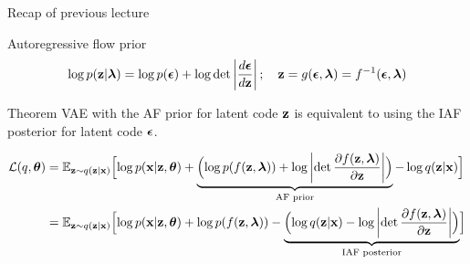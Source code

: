 

\begin{frame}
\titlepage
\end{frame}
\begin{frame}{Recap of previous lecture}
	\begin{block}{Autoregressive flow prior}
		\vspace{-0.5cm}
		\[
			\log p(\mathbf{z} | \boldsymbol{\lambda}) = \log p(\boldsymbol{\epsilon}) + \log \det \left | \frac{d \boldsymbol{\epsilon}}{d\mathbf{z}}\right|; \quad 
			\mathbf{z} = g(\boldsymbol{\epsilon}, \boldsymbol{\lambda}) = f^{-1}(\boldsymbol{\epsilon}, \boldsymbol{\lambda})
		\]
	\end{block}
	\vspace{-0.4cm}
	\begin{block}{Theorem}
	VAE with the AF prior for latent code $\mathbf{z}$ is equivalent to using the IAF posterior for latent code $\boldsymbol{\epsilon}$.
	\end{block}
	{\footnotesize
	\begin{align*}
		\mathcal{L}(q, \boldsymbol{\theta}) &= \mathbb{E}_{\mathbf{z} \sim q(\mathbf{z} | \mathbf{x})} \Bigl[ \log p(\mathbf{x} | \mathbf{z}, \boldsymbol{\theta}) + \underbrace{ \Bigl( \log p(f(\mathbf{z}, \boldsymbol{\lambda})) + \log \left| \det \frac{\partial f(\mathbf{z}, \boldsymbol{\lambda})}{\partial \mathbf{z}} \right| \Bigr) }_{\text{AF prior}} - \log q(\mathbf{z} | \mathbf{x}) \Bigr] \\
		&= \mathbb{E}_{\mathbf{z} \sim q(\mathbf{z} | \mathbf{x})} \Bigl[ \log p(\mathbf{x} | \mathbf{z}, \boldsymbol{\theta}) +  \log p(f(\mathbf{z}, \boldsymbol{\lambda})) - \underbrace{ \Bigl( \log q(\mathbf{z} | \mathbf{x}) - \log \left| \det \frac{\partial f(\mathbf{z}, \boldsymbol{\lambda})}{\partial \mathbf{z}} \right| \Bigr) }_{\text{IAF posterior}} \Bigr]
	\end{align*}
	}
\end{frame}

